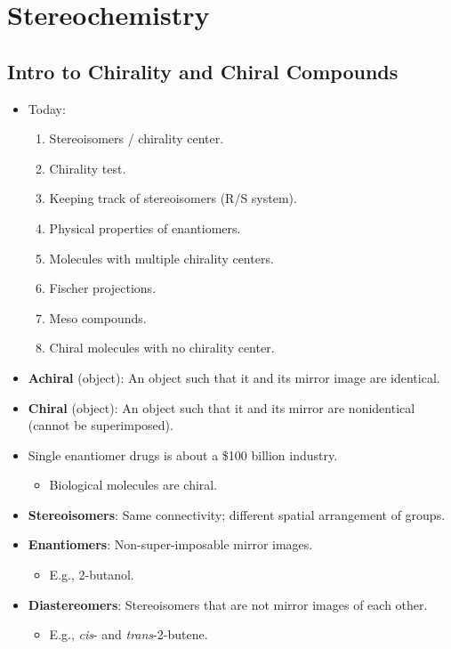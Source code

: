 \documentclass[../notes.tex]{subfiles}
\begin{document}
\chapter{Stereochemistry}
\section{Intro to Chirality and Chiral Compounds}
\begin{itemize}
    \item {}Today:
    \begin{enumerate}
        \item Stereoisomers / chirality center.
        \item Chirality test.
        \item Keeping track of stereoisomers (R/S system).
        \item Physical properties of enantiomers.
        \item Molecules with multiple chirality centers.
        \item Fischer projections.
        \item Meso compounds.
        \item Chiral molecules with no chirality center.
    \end{enumerate}
    \item \textbf{Achiral} (object): An object such that it and its mirror image are identical.
    \item \textbf{Chiral} (object): An object such that it and its mirror are nonidentical (cannot be superimposed).
    \item Single enantiomer drugs is about a \$100 billion industry.
    \begin{itemize}
        \item Biological molecules are chiral.
    \end{itemize}
    \item \textbf{Stereoisomers}: Same connectivity; different spatial arrangement of groups.
    \item \textbf{Enantiomers}: Non-super-imposable mirror images.
    \begin{itemize}
        \item E.g., 2-butanol.
    \end{itemize}
    \item \textbf{Diastereomers}: Stereoisomers that are not mirror images of each other.
    \begin{itemize}
        \item E.g., \emph{cis}- and \emph{trans}-2-butene.

\end{itemize}
\end{itemize}
\end{document}
